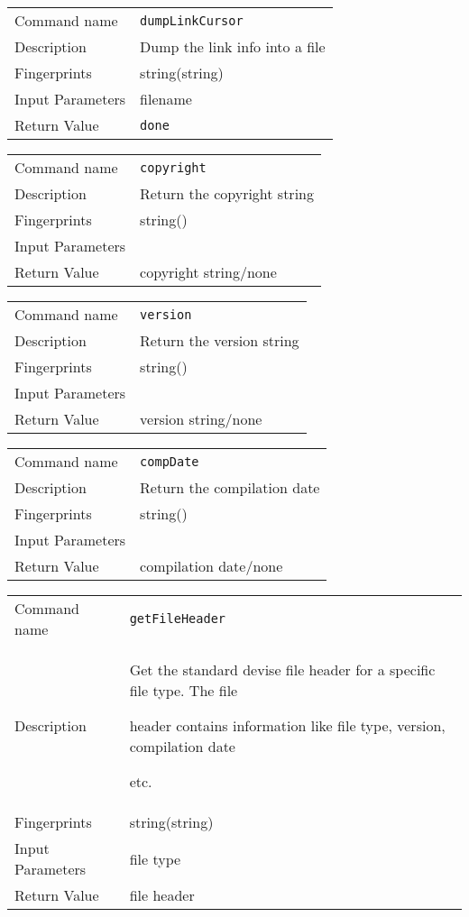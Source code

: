 \noindent
\begin{tabular}{l|p{5in}}
\hline
Command name &{\tt dumpLinkCursor }\\ 
Description &
Dump the link info into a file
 	\\
Fingerprints & string(string)\\
Input Parameters&filename\\
Return Value&{\tt done}\\
\hline
\end{tabular}
\bigskip

\noindent
\begin{tabular}{l|p{5in}}
\hline
Command name &{\tt copyright }\\ 
Description &
Return the copyright string
 	\\
Fingerprints & string()\\
Input Parameters&\\
Return Value&copyright string/none\\
\hline
\end{tabular}
\bigskip

\noindent
\begin{tabular}{l|p{5in}}
\hline
Command name &{\tt version }\\ 
Description &
Return the version string
 	\\
Fingerprints & string()\\
Input Parameters&\\
Return Value&version string/none\\
\hline
\end{tabular}
\bigskip

\noindent
\begin{tabular}{l|p{5in}}
\hline
Command name &{\tt compDate }\\ 
Description &
Return the compilation date 
 	\\
Fingerprints & string()\\
Input Parameters&\\
Return Value&compilation date/none\\
\hline
\end{tabular}
\bigskip

\noindent
\begin{tabular}{l|p{5in}}
\hline
Command name &{\tt getFileHeader }\\ 
Description &
Get the standard devise file header for a specific file type. The file
 
header contains information like file type, version, compilation date
 
etc.
 	\\
Fingerprints & string(string)\\
Input Parameters&file type\\
Return Value&file header\\
\hline
\end{tabular}
\bigskip

